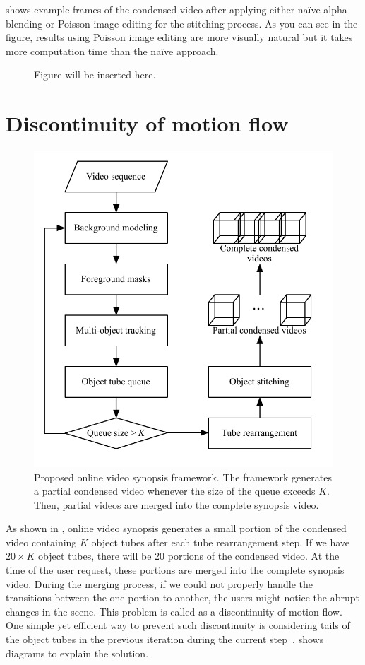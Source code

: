 \documentclass[11pt]{hyu_thesis}
\begin{document}
 shows example frames of the condensed video after applying either na\"ive alpha blending or Poisson image editing for the stitching process. As you can see in the figure, results using Poisson image editing are more visually natural but it takes more computation time than the na\"ive approach.
\begin{figure}
	\centering
	\caption{Figure will be inserted here.}
	\label{fig:poisson_fg_bg}
\end{figure}

\section{Discontinuity of motion flow}
\begin{figure}
	\centering
	\includegraphics[width=0.8\linewidth]{framework.pdf}
	\caption{Proposed online video synopsis framework. The framework generates a partial condensed video whenever the size of the queue exceeds $K$. Then, partial videos are merged into the complete synopsis video.}
	\label{fig:framework}
\end{figure}
As shown in , online video synopsis generates a small portion of the condensed video containing $K$ object tubes after each tube rearrangement step. If we have $20 \times K$ object tubes, there will be 20 portions of the condensed video. At the time of the user request, these portions are merged into the complete synopsis video. During the merging process, if we could not properly handle the transitions between the one portion to another, the users might notice the abrupt changes in the scene. This problem is called as a discontinuity of motion flow. One simple yet efficient way to prevent such discontinuity is considering tails of the object tubes in the previous iteration during the current step~\cite{Fu2014}.  shows diagrams to explain the solution.
\end{document}
